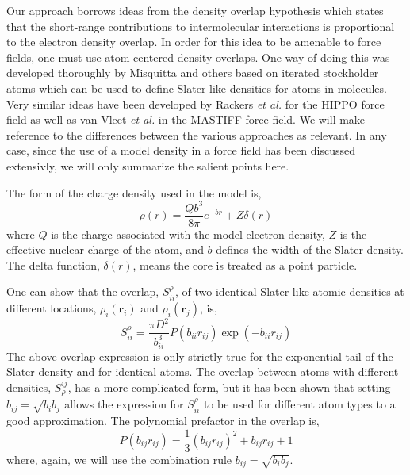 \documentclass[journal=jacsat,manuscript=article]{achemso}
\begin{document}
Our approach borrows ideas from the density overlap hypothesis\cite{kim1981dependence,wheatley1990overlap,gavezzotti2002calculation,van2016beyond,van2018new}
which states that the short-range contributions to intermolecular
interactions is proportional to the electron density overlap. In order
for this idea to be amenable to force fields, one must use atom-centered
density overlaps. One way of doing this was developed thoroughly by
Misquitta and others\cite{misquitta2014distributed,misquitta2018isa} based
on iterated stockholder atoms which can be used to define Slater-like
densities for atoms in molecules. Very similar ideas have been developed
by Rackers \textit{et al.}\cite{rackers2021polarizable} for the HIPPO force field
as well as van Vleet \textit{et al.} in the MASTIFF force field.\cite{van2016beyond,van2018new} 
We will make reference to the differences between the various approaches as relevant.
In any case, since the use of a model density in a force field has been discussed extensivly,
we will only summarize the salient points here.

The form of the charge density used in the model is,
\begin{equation}
  \rho(r)=\frac{Qb^3}{8\pi}e^{-br}+Z\delta(r)
  \label{eq:slater}
\end{equation}
\noindent
where $Q$ is the charge associated with the model electron density,
$Z$ is the effective nuclear charge of the atom, and $b$ defines the width
of the Slater density. The delta function, $\delta(r)$, means the core is
treated as a point particle.

One can show that the overlap, $S_{ii}^\rho$, of two identical Slater-like atomic densities
at different locations, $\rho_i(\bm{r}_i)$ and $\rho_i(\bm{r}_j)$, is,
\begin{equation}
  S_{ii}^\rho=\frac{\pi D^2}{b_{ii}^3}P(b_{ii}r_{ij})\exp(-b_{ii}r_{ij})
\end{equation}
The above overlap expression is only strictly true for the exponential tail
of the Slater density and for identical atoms. The overlap between atoms
with different densities, $S^{ij}_\rho$, has a more complicated form, but
it has been shown that setting $b_{ij}=\sqrt{b_ib_j}$ allows the expression
for $S_{ii}^\rho$ to be used for different atom types to a good
approximation\cite{van2016beyond}. The polynomial prefactor in the overlap is,
\begin{equation}
  P(b_{ij}r_{ij})=\frac13(b_{ij}r_{ij})^2 + b_{ij}r_{ij}+1
\end{equation}
where, again, we will use the combination rule $b_{ij}=\sqrt{b_ib_j}$.
\end{document}
